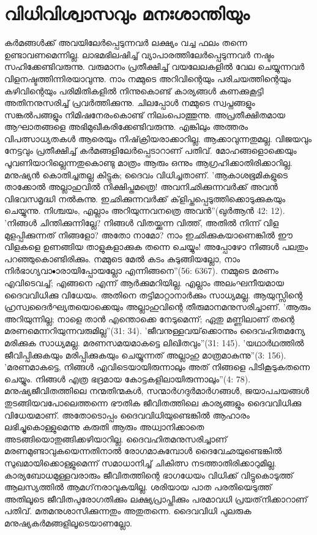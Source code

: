\section{വിധിവിശ്വാസവും മനഃശാന്തിയും}

കര്‍മങ്ങള്‍ക്ക് അവയിലേര്‍പ്പെടുന്നവര്‍ ലക്ഷ്യം വച്ച ഫലം തന്നെ ഉണ്ടാവണമെന്നില്ല. ലാഭമഭിലഷിച്ച് വ്യാപാരത്തിലേര്‍പ്പെടുന്നവര്‍ നഷ്ടം സഹിക്കേണ്ടിവരുന്നു. വരുമാനം പ്രതീക്ഷിച്ച് വയലേലകളില്‍ വേല ചെയ്യുന്നവര്‍ വിളനഷ്ടത്തിന്നിരയാവുന്നു. നാം നമ്മുടെ അറിവിന്റെയും പരിചയത്തിന്റെയും കഴിവിന്റെയും പരിമിതികളില്‍ നിന്നുകൊണ്ട് കാര്യങ്ങള്‍ കണക്കുകൂട്ടി അതിനനുസരിച്ച് പ്രവര്‍ത്തിക്കുന്നു. ചിലപ്പോള്‍ നമ്മുടെ സ്വപ്നങ്ങളും സങ്കല്‍പങ്ങളും നിമിഷനേരംകൊണ്ട് നിലംപൊത്തുന്നു. അപ്രതീക്ഷിതമായ ആഘാതങ്ങളെ അഭിമുഖീകരിക്കേണ്ടിവരുന്നു. എങ്കിലും അത്തരം വിപത്സാധ്യതകള്‍ ആരെയും നിഷ്‌ക്രിയരാക്കാറില്ല. ആക്കാവുന്നതുമല്ല. വിജയവും നേട്ടവും പ്രതീക്ഷിച്ച് കര്‍മങ്ങളിലേര്‍പ്പെടാറാണ് പതിവ്. മോഹങ്ങളൊക്കെയും പൂവണിയാറില്ലെന്നതുകൊണ്ടു മാത്രം ആരും ഒന്നും ആഗ്രഹിക്കാതിരിക്കാറില്ല. മനുഷ്യന്‍ കൊതിച്ചതല്ല കിട്ടുക; ദൈവം വിധിച്ചതാണ്.
'ആകാശഭൂമികളുടെ താക്കോല്‍ അല്ലാഹുവില്‍ നിക്ഷിപ്തമത്രെ! അവനിഛിക്കുന്നവര്‍ക്ക് അവന്‍ വിഭവസമൃദ്ധി നല്‍കുന്നു. ഇഛിക്കുന്നവര്‍ക്ക് ക്‌ളിപ്തപ്പെടുത്തിക്കൊടുക്കുകയും ചെയ്യുന്നു. നിശ്ചയം, എല്ലാം അറിയുന്നവനത്രെ അവന്‍''(ഖുര്‍ആന്‍ 42: 12).
'നിങ്ങള്‍ ചിന്തിക്കുന്നില്ലേ? നിങ്ങള്‍ വിതയ്ക്കുന്ന വിത്ത്, അതില്‍ നിന്ന് വിള മുളപ്പിക്കുന്നത് നിങ്ങളോ? അതോ നാമോ? നാം ഇഛിക്കുകയാണെങ്കില്‍ ഈ വിളകളെ ഉണങ്ങിയ താളുകളാക്കുക തന്നെ ചെയ്യും! അപ്പോഴോ നിങ്ങള്‍ പലതും പറഞ്ഞുകൊണ്ടിരിക്കും. നമ്മുടെ മേല്‍ കടം കുടുങ്ങിയല്ലോ, നാം നിര്‍ഭാഗ്യവാ•ാരായിപ്പോയല്ലോ എന്നിങ്ങനെ''(56: 6367).
നമ്മുടെ മരണം എവിടെവച്ച്; എങ്ങനെ എന്ന് ആര്‍ക്കുമറിയില്ല. എല്ലാം അലംഘനീയമായ ദൈവവിധിക്കു വിധേയം. അതിനെ തട്ടിമാറ്റാനാര്‍ക്കും സാധ്യമല്ല. ആയുസ്സിന്റെ ഹ്രസ്വദൈര്‍ഘ്യതയൊക്കെയും അല്ലാഹുവിന്റെ തീരുമാനമനുസരിച്ചാണ്.
'ആരും അറിയുന്നില്ല; നാളെ താന്‍ എന്തൊക്കെ നേടുമെന്ന്; ഏതു മണ്ണിലാണ് തന്റെ മരണമെന്നറിയുന്നവരുമില്ല''(31: 34).
'ജീവനുള്ളവയ്‌ക്കൊന്നും ദൈവഹിതമന്യേ മരിക്കുക സാധ്യമല്ല. മരണസമയമാകട്ടെ ലിഖിതവും''(31: 145). 'യഥാര്‍ഥത്തില്‍ ജീവിപ്പിക്കുകയും മരിപ്പിക്കുകയും ചെയ്യുന്നത് അല്ലാഹു മാത്രമാകുന്നു''(3: 156). 'മരണമാകട്ടെ, നിങ്ങള്‍ എവിടെയായിരുന്നാലും അത് നിങ്ങളെ പിടികൂടുകതന്നെ ചെയ്യും. നിങ്ങള്‍ എത്ര ഭദ്രമായ കോട്ടകളിലായിരുന്നാലും''(4: 78).
മനുഷ്യജീവിതത്തിലെ നന്മതിന്മകള്‍, സന്മാര്‍ഗദുര്‍മാര്‍ഗങ്ങള്‍, ജയാപചയങ്ങള്‍ തുടങ്ങിയവപോലെത്തന്നെ ഭൗതിക ജീവിതത്തിലെ കാര്യങ്ങളും ദൈവവിധിക്കു വിധേയമാണ്. അതോടൊപ്പം ദൈവവിധിയുണ്ടെങ്കില്‍ ആഹാരം ലഭിച്ചുകൊള്ളുമെന്നു കരുതി ആരും അധ്വാനിക്കാതെ അടങ്ങിയൊതുങ്ങിക്കഴിയാറില്ല. ദൈവഹിതമനുസരിച്ചാണ് മരണമുണ്ടാവുകയെന്നതിനാല്‍ രോഗമാകുമ്പോള്‍ ദൈവേഛയുണ്ടെങ്കില്‍ സുഖമായിക്കൊള്ളുമെന്ന് സമാധാനിച്ച് ചികിത്സ നടത്താതിരിക്കാറുമില്ല. കാര്യബോധമുള്ളവരാരും ജീവിതത്തിന്റെ ഭാഗധേയം വിധിക്ക് വിട്ടുകൊടുത്ത് ആലസ്യത്തില്‍ ആമഗ്‌നരാവുകയില്ല. ശരിയായ പാത പരതിയെടുത്ത് അതിലൂടെ ജീവിതപുരോഗതിക്കും ലക്ഷ്യപ്രാപ്തിക്കും പരമാവധി പ്രയത്‌നിക്കാറാണ് പതിവ്. മതമനുശാസിക്കുന്നതും അതുതന്നെ. ദൈവവിധി പുലരുക മനുഷ്യകര്‍മങ്ങളിലൂടെയാണല്ലോ.
